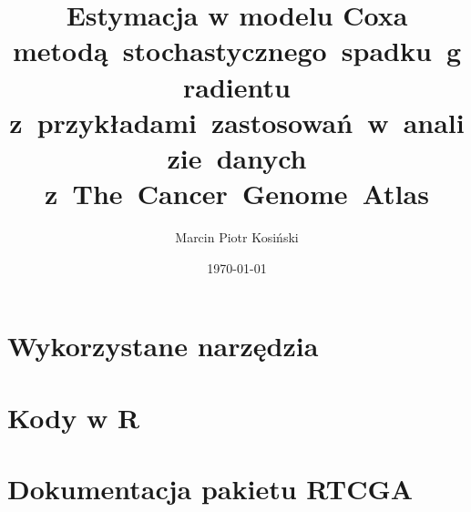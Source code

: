 \documentclass[english]{mini}
\title{Estymacja w modelu Coxa metodą~stochastycznego~spadku~gradientu z~przykładami~zastosowań~w~analizie~danych z~The~Cancer~Genome~Atlas}
\author{Marcin Piotr Kosiński}
\date{\today}
\begin{document}
\maketitle
\tableofcontents













\appendix

\chapter{Wykorzystane narzędzia}
\chapter{Kody w R}
\chapter{Dokumentacja pakietu RTCGA}





\makestatement
\end{document}
